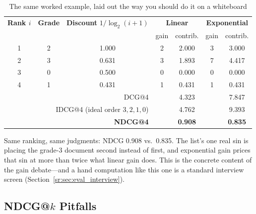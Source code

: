 \begin{table}[H]
\centering
\small
\caption{The same worked example, laid out the way you should do it on a whiteboard}
\label{sr:tab:ndcg_worked}
\begin{tabular}{ccccccc}
\toprule
\textbf{Rank $i$} & \textbf{Grade} & \textbf{Discount} $1/\log_2(i{+}1)$ & \multicolumn{2}{c}{\textbf{Linear}} & \multicolumn{2}{c}{\textbf{Exponential}} \\
 & & & gain & contrib. & gain & contrib. \\
\midrule
1 & 2 & 1.000 & 2 & 2.000 & 3 & 3.000 \\
2 & 3 & 0.631 & 3 & 1.893 & 7 & 4.417 \\
3 & 0 & 0.500 & 0 & 0.000 & 0 & 0.000 \\
4 & 1 & 0.431 & 1 & 0.431 & 1 & 0.431 \\
\midrule
\multicolumn{3}{r}{DCG@4} & & 4.323 & & 7.847 \\
\multicolumn{3}{r}{IDCG@4 (ideal order $3,2,1,0$)} & & 4.762 & & 9.393 \\
\multicolumn{3}{r}{\textbf{NDCG@4}} & & \textbf{0.908} & & \textbf{0.835} \\
\bottomrule
\end{tabular}
\end{table}

Same ranking, same judgments: NDCG 0.908 vs.\ 0.835. The list's one real sin is placing the grade-3 document second instead of first, and exponential gain prices that sin at more than twice what linear gain does. This is the concrete content of the gain debate---and a hand computation like this one is a standard interview screen (Section~\ref{sr:sec:eval_interview}).

\subsection{NDCG@\texorpdfstring{$k$}{k} Pitfalls}

